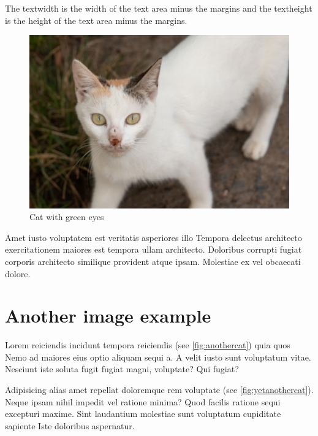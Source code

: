 \documentclass[
    14pt,
    letterpaper,
]{extreport}
\begin{document}
The textwidth is the width of the text area minus the margins and the textheight
is the height of the text area minus the margins.

\begin{figure}[H]
  \centering
    \includegraphics[width=1\textwidth]{./assets/cat}
  \caption{Cat with green eyes}\label{fig:cat}
\end{figure}

Amet iusto voluptatem est veritatis asperiores illo Tempora delectus architecto exercitationem maiores est tempora ullam architecto. Doloribus corrupti fugiat corporis architecto similique provident atque ipsam. Molestiae ex vel obcaecati dolore.

\section{Another image example}

Lorem reiciendis incidunt tempora reiciendis (see \autoref{fig:anothercat}) quia quos Nemo ad maiores eius optio aliquam sequi a. A velit iusto sunt voluptatum vitae. Nesciunt iste soluta fugit fugiat magni, voluptate? Qui fugiat?

Adipisicing alias amet repellat doloremque rem voluptate (see \autoref{fig:yetanothercat}). Neque ipsam nihil impedit vel ratione minima? Quod facilis ratione sequi excepturi maxime. Sint laudantium molestiae sunt voluptatum cupiditate sapiente Iste doloribus aspernatur.
\end{document}

